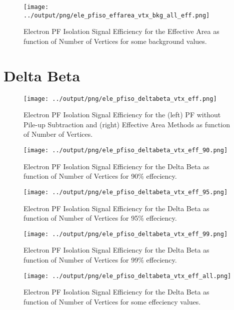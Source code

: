 \documentclass[11pt]{book}
\begin{document}
\begin{figure}[htb]
\centering
\texttt{[image: ../output/png/ele\_pfiso\_effarea\_vtx\_bkg\_all\_eff.png]}
\caption{Electron PF Isolation Signal Efficiency for the Effective Area as function of Number of Vertices for some background values.}
\label{fig:ele_pfiso_vtx_eff_effarea_bkg_all_eff}
\end{figure}
\clearpage

\section{Delta Beta}
\begin{figure}[htb]
\centering
\texttt{[image: ../output/png/ele\_pfiso\_deltabeta\_vtx\_eff.png]}
\caption{Electron PF Isolation Signal Efficiency for the (left) PF without Pile-up Subtraction and (right) Effective Area Methods as function of Number of Vertices.}
\label{fig:ele_pfiso_vtx_eff_deltabeta}
\end{figure}

\begin{figure}[htb]
\centering
\texttt{[image: ../output/png/ele\_pfiso\_deltabeta\_vtx\_eff\_90.png]}
\caption{Electron PF Isolation Signal Efficiency for the Delta Beta as function of Number of Vertices for 90\% effeciency.}
\label{fig:ele_pfiso_vtx_eff_deltabeta_eff_90}
\end{figure}

\begin{figure}[htb]
\centering
\texttt{[image: ../output/png/ele\_pfiso\_deltabeta\_vtx\_eff\_95.png]}
\caption{Electron PF Isolation Signal Efficiency for the Delta Beta as function of Number of Vertices for 95\% effeciency.}
\label{fig:ele_pfiso_vtx_eff_deltabeta_eff_95}
\end{figure}

\begin{figure}[htb]
\centering
\texttt{[image: ../output/png/ele\_pfiso\_deltabeta\_vtx\_eff\_99.png]}
\caption{Electron PF Isolation Signal Efficiency for the Delta Beta as function of Number of Vertices for 99\% effeciency.}
\label{fig:ele_pfiso_vtx_eff_deltabeta_eff_99}
\end{figure}

\begin{figure}[htb]
\centering
\texttt{[image: ../output/png/ele\_pfiso\_deltabeta\_vtx\_eff\_all.png]}
\caption{Electron PF Isolation Signal Efficiency for the Delta Beta as function of Number of Vertices for some effeciency values.}
\label{fig:ele_pfiso_vtx_eff_deltabeta_eff_all}
\end{figure}
\end{document}
